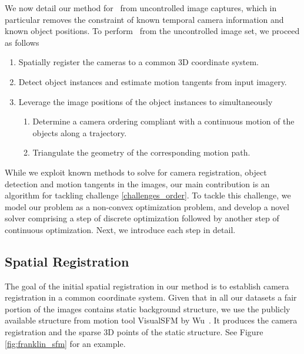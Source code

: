 We now detail our method for \jost~from uncontrolled image captures, which in particular removes the constraint of known temporal camera information and known object positions. To perform \jost~from the uncontrolled image set, we proceed as follows
\begin{enumerate}
\item \label{challenges_sfm} Spatially register the cameras to a common 3D coordinate system.
\item \label{challenges_tang} Detect object instances and estimate motion tangents from input imagery.
\item \label{challenges_order} Leverage the image positions of the object instances to simultaneously
\begin{enumerate}
\item Determine a camera ordering compliant with a continuous motion of the objects along a trajectory.
\item Triangulate the geometry of the corresponding motion path.
\end{enumerate}

\end{enumerate}
While we exploit known methods to solve for camera registration, object detection and motion tangents in the images, our main contribution is an algorithm for tackling challenge  \ref{challenges_order}. To tackle this challenge, we model our problem as a non-convex optimization problem, and develop a novel solver comprising a step of discrete optimization followed by another step of continuous optimization. 
Next, we introduce each step in detail.

\subsection{Spatial Registration}
The goal of the initial spatial registration in our method is to establish camera registration in a common coordinate system.
Given that in all our datasets a fair portion of the images contains static background structure, we use the publicly available structure from motion tool VisualSFM by Wu~\cite{WuVSFM}. It produces the camera registration and the sparse 3D points of the static structure. See Figure \ref{fig:franklin_sfm} for an example.

